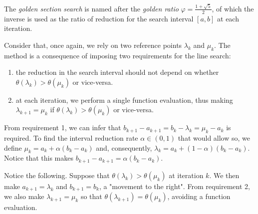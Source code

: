 The \emph{golden section search} is named after the \emph{golden ratio} $\varphi =  \frac{1 + \sqrt{5}}{2}$, of which the inverse is used as the ratio of reduction for the search interval $[a,b]$ at each iteration. 

Consider that, once again, we rely on two reference points $\lambda_k$ and $\mu_k$. The method is a consequence of imposing two requirements for the line search:
%
\begin{enumerate}
\item the reduction in the search interval should not depend on whether $\theta(\lambda_k) > \theta(\mu_k)$ or vice-versa.
\item at each iteration, we perform a single function evaluation, thus making $\lambda_{k+1} = \mu_{k}$ if $\theta(\lambda_k) > \theta(\mu_k)$ or vice-versa.
\end{enumerate}
% 
From requirement 1, we can infer that $b_{k+1} - a_{k+1} = b_k - \lambda_k = \mu_k - a_k$ is required. To find the interval reduction rate $\alpha \in (0,1)$ that would allow so, we define $\mu_k = a_k + \alpha(b_k - a_k)$ and, consequently, $\lambda_k = a_k + (1-\alpha)(b_k - a_k)$. Notice that this makes $b_{k+1} - a_{k+1} = \alpha(b_k - a_k)$.

Notice the following. Suppose that $\theta(\lambda_k) > \theta(\mu_k)$ at iteration $k$. We then make $a_{k+1} = \lambda_k$ and $b_{k+1} = b_k$, a "movement to the right". From requirement 2, we also make $\lambda_{k+1} = \mu_{k}$ so that $\theta(\lambda_{k+1}) = \theta(\mu_{k})$, avoiding a function evaluation. 

